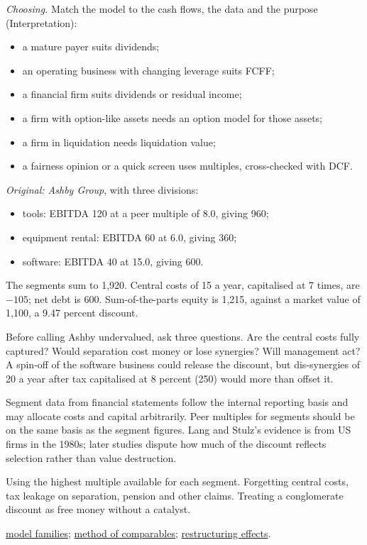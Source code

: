 \begin{qfmethod}
\emph{Choosing.} Match the model to the cash flows, the data and the purpose (Interpretation):
\begin{itemize}
\item a mature payer suits dividends;
\item an operating business with changing leverage suits FCFF;
\item a financial firm suits dividends or residual income;
\item a firm with option-like assets needs an option model for those assets;
\item a firm in liquidation needs liquidation value;
\item a fairness opinion or a quick screen uses multiples, cross-checked with DCF.
\end{itemize}

 \emph{Original: Ashby Group}, with three divisions:
\begin{itemize}
\item tools: EBITDA 120 at a peer multiple of 8.0, giving 960;
\item equipment rental: EBITDA 60 at 6.0, giving 360;
\item software: EBITDA 40 at 15.0, giving 600.
\end{itemize}
The segments sum to 1,920. Central costs of 15 a year, capitalised at 7 times, are $-105$; net debt is 600. Sum-of-the-parts equity is 1,215, against a market value of 1,100, a 9.47 percent discount.

Before calling Ashby undervalued, ask three questions. Are the central costs fully captured? Would separation cost money or lose synergies? Will management act? A spin-off of the software business could release the discount, but dis-synergies of 20 a year after tax capitalised at 8 percent (250) would more than offset it.

 Segment data from financial statements follow the internal reporting basis and may allocate costs and capital arbitrarily. Peer multiples for segments should be on the same basis as the segment figures. Lang and Stulz's evidence is from US firms in the 1980s; later studies dispute how much of the discount reflects selection rather than value destruction.

 Using the highest multiple available for each segment. Forgetting central costs, tax leakage on separation, pension and other claims. Treating a conglomerate discount as free money without a catalyst.

 \hyperref[def:valuation-model-families]{model families}; \hyperref[meth:comparables-evaluation]{method of comparables}; \hyperref[ex:restructuring-valuation-effects]{restructuring effects}.

\end{qfmethod}

